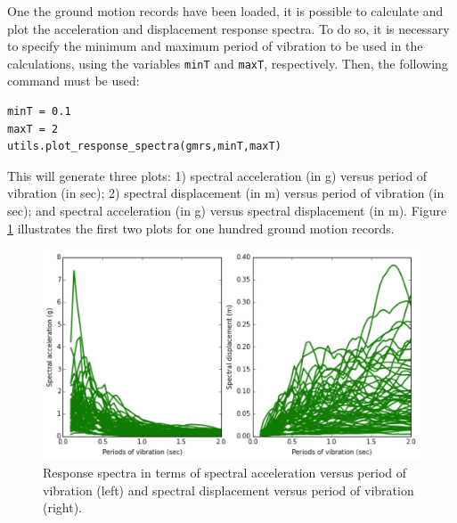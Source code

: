 One the ground motion records have been loaded, it is possible to calculate and plot the acceleration and displacement response spectra. To do so, it is necessary to specify the minimum and maximum period of vibration to be used in the calculations, using the variables \verb=minT= and \verb=maxT=, respectively. Then, the following command must be used:

\begin{Verbatim}[frame=single, commandchars=\\\{\}, samepage=true]
minT = 0.1
maxT = 2
utils.plot_response_spectra(gmrs,minT,maxT)
\end{Verbatim}

This will generate three plots: 1) spectral acceleration (in g) versus period of vibration (in sec); 2) spectral displacement (in m) versus period of vibration (in sec); and spectral acceleration (in g) versus spectral displacement (in m). Figure \ref{fig:gmrs} illustrates the first two plots for one hundred ground motion records.


\begin{figure}[!htbp]
\centering
\includegraphics[width=13cm]{figures/gmrs.png}
\caption{Response spectra in terms of spectral acceleration versus period of vibration (left) and spectral displacement versus period of vibration (right).}
\label{fig:gmrs}
\end{figure}
